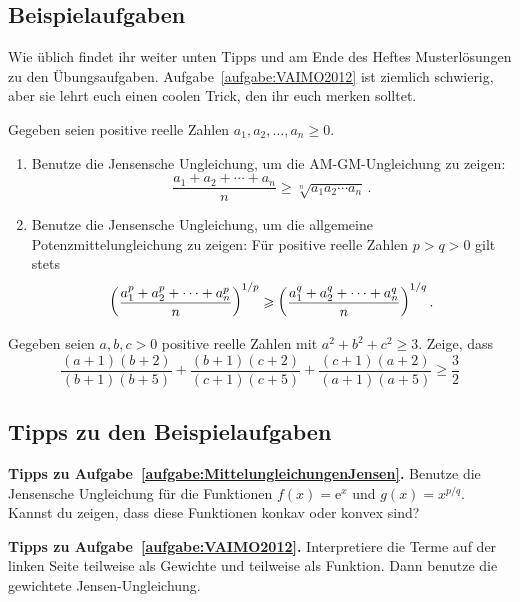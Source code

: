 \subsection*{Beispielaufgaben}
Wie üblich findet ihr weiter unten Tipps und am Ende des Heftes Musterlösungen zu den Übungsaufgaben. Aufgabe~\ref{aufgabe:VAIMO2012} ist ziemlich schwierig, aber sie lehrt euch einen coolen Trick, den ihr euch merken solltet.
\begin{aufgabe*}\label{aufgabe:MittelungleichungenJensen}
	Gegeben seien positive reelle Zahlen $a_1,a_2,\dotsc,a_n\geqslant 0$.
	\begin{enumerate}[label={$(\alph*)$},ref={$(\alph*)$}]
		\item Benutze die Jensensche Ungleichung, um die AM-GM-Ungleichung zu zeigen:\label{aufgabe:AM-GM-MitJensen}
		\begin{equation*}
			\frac{a_1+a_2+\dotsb+a_n}{n}\geqslant \sqrt[n]{a_1a_2\dotsm a_n}\,.
		\end{equation*}
		\item Benutze die Jensensche Ungleichung, um die allgemeine Potenzmittelungleichung zu zeigen: Für positive reelle Zahlen $p>q>0$ gilt stets\label{aufgabe:PotenzmittelMitJensen}
		\begin{equation*}
			\parens*{\frac{a_1^{p}+a_2^{p}+\dotsb+a_n^{p}}{n}}^{1/p}\geqslant \parens*{\frac{a_1^{q}+a_2^{q}+\dotsb+a_n^q}{n}}^{1/q}\,.
		\end{equation*}
	\end{enumerate}
\end{aufgabe*}
\begin{aufgabe*}[**]\label{aufgabe:VAIMO2012}
	Gegeben seien $a,b,c>0$ positive reelle Zahlen mit $a^2+b^2+c^2\geqslant 3$. Zeige, dass
	\begin{equation*}
		\frac{(a+1)(b+2)}{(b+1)(b+5)}+\frac{(b+1)(c+2)}{(c+1)(c+5)}+\frac{(c+1)(a+2)}{(a+1)(a+5)}\geqslant\frac32
	\end{equation*}
\end{aufgabe*}

\subsection*{Tipps zu den Beispielaufgaben}
\textbf{Tipps zu Aufgabe~\ref{aufgabe:MittelungleichungenJensen}.} Benutze die Jensensche Ungleichung für die Funktionen $f(x)=\mathrm{e}^x$ und $g(x)=x^{p/q}$. Kannst du zeigen, dass diese Funktionen konkav oder konvex sind?

\textbf{Tipps zu Aufgabe~\ref{aufgabe:VAIMO2012}.} Interpretiere die Terme auf der linken Seite teilweise als Gewichte und teilweise als Funktion. Dann benutze die gewichtete Jensen-Ungleichung.

